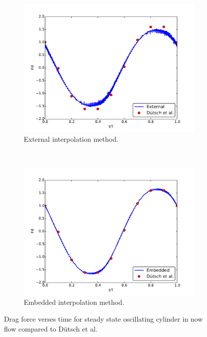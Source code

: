 \documentclass[preprint,12pt]{elsarticle}
\begin{document}
\begin{figure}[!htb]
	\centering
	\par\medskip
	\begin{subfigure}{0.4\textwidth}
		\includegraphics[width=\linewidth]{staticexss}
		\caption{External interpolation method.}
	\end{subfigure}
	~
	\begin{subfigure}{0.4\textwidth}
		\includegraphics[width=\linewidth]{staticemss}
		\caption{Embedded interpolation method.}
	\end{subfigure}
	\caption{Drag force verses time for steady state oscillating cylinder in now flow compared to D\"{u}tsch et al.~\cite{dutsch1998low}}
	\label{fig:static2}
\end{figure}
\end{document}
